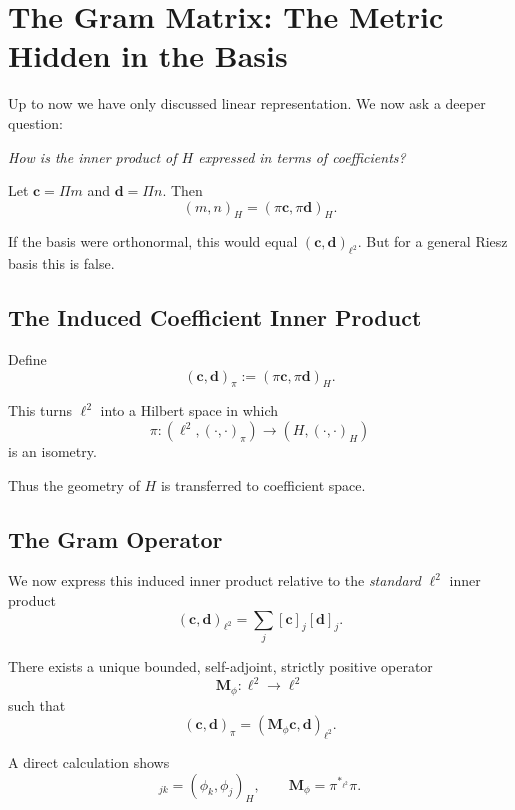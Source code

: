 \documentclass[11pt,twoside,openright]{book}
\theoremstyle{plain}
\theoremstyle{definition}
\theoremstyle{remark}
\begin{document}
\section{The Gram Matrix: The Metric Hidden in the Basis}

Up to now we have only discussed linear representation.
We now ask a deeper question:

\medskip
\emph{How is the inner product of $H$ expressed in terms of coefficients?}
\medskip

Let $\mathbf{c} = \Pi m$ and $\mathbf{d} = \Pi n$.
Then
\[
(m,n)_H
=
(\pi \mathbf{c}, \pi \mathbf{d})_H.
\]

If the basis were orthonormal, this would equal $(\mathbf{c},\mathbf{d})_{\ell^2}$.
But for a general Riesz basis this is false.

\subsection{The Induced Coefficient Inner Product}

Define
\begin{equation}
(\mathbf{c},\mathbf{d})_\pi := (\pi \mathbf{c},\pi \mathbf{d})_H .
\end{equation}

This turns $\ell^2$ into a Hilbert space in which
\[
\pi : (\ell^2,(\cdot,\cdot)_\pi)
\to
(H,(\cdot,\cdot)_H)
\]
is an isometry.

Thus the geometry of $H$ is transferred to coefficient space.

\subsection{The Gram Operator}

We now express this induced inner product relative to the
\emph{standard} $\ell^2$ inner product
\[
(\mathbf{c},\mathbf{d})_{\ell^2} = \sum_j [\mathbf{c}]_j [\mathbf{d}]_j.
\]

There exists a unique bounded, self-adjoint, strictly positive operator
\[
\mathbf{M}_\phi : \ell^2 \to \ell^2
\]
such that
\begin{equation}
(\mathbf{c},\mathbf{d})_\pi = (\mathbf{M}_\phi \mathbf{c}, \mathbf{d})_{\ell^2}.
\end{equation}

A direct calculation shows
\begin{equation}
[\mathbf{M}_\phi]_{jk} = (\phi_k,\phi_j)_H,
\qquad
\mathbf{M}_\phi = \pi^{*_{\ell^2}} \pi.
\end{equation}
\end{document}
